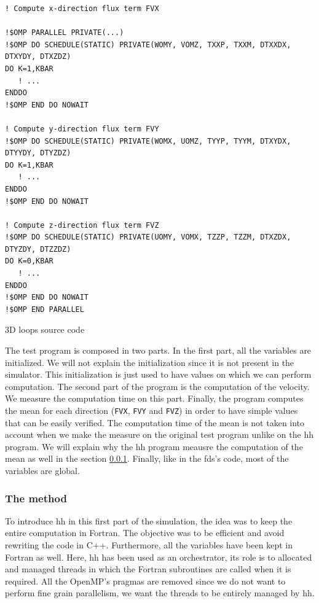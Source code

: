 \begin{listing}[ht!]
\begin{verbatim}
! Compute x-direction flux term FVX

!$OMP PARALLEL PRIVATE(...)
!$OMP DO SCHEDULE(STATIC) PRIVATE(WOMY, VOMZ, TXXP, TXXM, DTXXDX, DTXYDY, DTXZDZ)
DO K=1,KBAR
   ! ...
ENDDO
!$OMP END DO NOWAIT

! Compute y-direction flux term FVY
!$OMP DO SCHEDULE(STATIC) PRIVATE(WOMX, UOMZ, TYYP, TYYM, DTXYDX, DTYYDY, DTYZDZ)
DO K=1,KBAR
   ! ...
ENDDO
!$OMP END DO NOWAIT

! Compute z-direction flux term FVZ
!$OMP DO SCHEDULE(STATIC) PRIVATE(UOMY, VOMX, TZZP, TZZM, DTXZDX, DTYZDY, DTZZDZ)
DO K=0,KBAR
   ! ...
ENDDO
!$OMP END DO NOWAIT
!$OMP END PARALLEL
\end{verbatim}
\caption{3D loops source code}
\label{lst:3Dloopscode}
\end{listing}

The test program is composed in two parts. In the first part, all the variables
are initialized. We will not explain the initialization since it is not present
in the simulator. This initialization is just used to have values on which we
can perform computation. The second part of the program is the computation of
the velocity. We measure the computation time on this part. Finally, the program
computes the mean for each direction (\texttt{FVX}, \texttt{FVY} and
\texttt{FVZ}) in order to have simple values that can be easily verified. The
computation time of the mean is not taken into account when we make the measure
on the original test program unlike on the \gls{hh} program. We will explain why
the \gls{hh} program meausre the computation of the mean as well in the section
\ref{sec:3Dloopsmethod}. Finally, like in the \gls{fds}'s code, most of the
variables are global.

\subsubsection{The method}
\label{sec:3Dloopsmethod}

To introduce \gls{hh} in this first part of the simulation, the idea was to keep
the entire computation in Fortran. The objective was to be efficient and avoid
rewriting the code in C++. Furthermore, all the variables have been kept in
Fortran as well. Here, \gls{hh} has been used as an orchestrator, its role is to
allocated and managed threads in which the Fortran subroutines are called when
it is required. All the OpenMP's pragmas are removed since we do not want to
perform fine grain parallelism, we want the threads to be entirely managed by
\gls{hh}.

